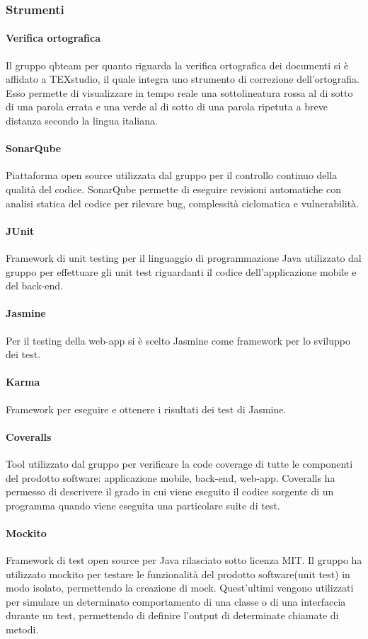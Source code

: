 \subsubsection{Strumenti}

\paragraph{Verifica ortografica}
Il gruppo qbteam per quanto riguarda la verifica ortografica dei documenti si è affidato a TEXstudio, il quale integra uno strumento di correzione dell'ortografia. Esso permette di visualizzare in tempo reale una sottolineatura rossa al di sotto di una parola errata e una verde al di sotto di una parola ripetuta a breve distanza secondo la lingua italiana.  
\paragraph{SonarQube}
Piattaforma open source utilizzata dal gruppo per il controllo continuo della qualità del codice. SonarQube permette di eseguire revisioni automatiche con analisi statica del codice per rilevare bug, complessità ciclomatica e vulnerabilità.
\paragraph{JUnit}
Framework di unit testing per il linguaggio di programmazione Java utilizzato dal gruppo per effettuare gli unit test riguardanti il codice dell'applicazione mobile e del back-end.
\paragraph{Jasmine}
Per il testing della web-app si è scelto Jasmine come framework per lo sviluppo dei test.
\paragraph{Karma}
Framework per eseguire e ottenere i risultati dei test di Jasmine.
\paragraph{Coveralls}
Tool utilizzato dal gruppo per verificare la code coverage di tutte le componenti del prodotto software: applicazione mobile, back-end, web-app. Coveralls ha permesso di descrivere il grado in cui viene eseguito il codice sorgente di un programma quando viene eseguita una particolare suite di test.
\paragraph{Mockito}
Framework di test open source per Java rilasciato sotto licenza MIT. Il gruppo ha utilizzato mockito per testare le funzionalità del prodotto software(unit test) in modo isolato, permettendo la creazione di 
mock. Quest'ultimi vengono utilizzati per simulare un determinato comportamento di una classe o di una interfaccia durante un test, permettendo di definire l'output di determinate chiamate di metodi.
